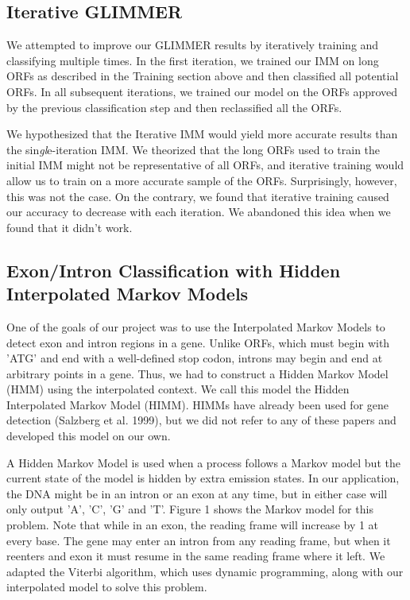 \documentclass[11pt,letterpaper]{article}
\begin{document}
\subsection{Iterative GLIMMER}
We attempted to improve our GLIMMER results by iteratively training and classifying multiple times. In the first iteration, we trained our IMM on long ORFs as described in the Training section above and then classified all potential ORFs. In all subsequent iterations, we trained our model on the ORFs approved by the previous classification step and then reclassified all the ORFs.

We hypothesized that the Iterative IMM would yield more accurate results than the sin\textit{gl}e-iteration IMM. We theorized that the long ORFs used to train the initial IMM might not be representative of all ORFs, and iterative training would allow us to train on a more accurate sample of the ORFs. Surprisingly, however, this was not the case. On the contrary, we found that iterative training caused our accuracy to decrease with each iteration. We abandoned this idea when we found that it didn't work.

\subsection{Exon/Intron Classification with Hidden Interpolated Markov Models}
One of the goals of our project was to use the Interpolated Markov Models to detect exon and intron regions in a gene. Unlike ORFs, which must begin with 'ATG' and end with a well-defined stop codon, introns may begin and end at arbitrary points in a gene. Thus, we had to construct a Hidden Markov Model (HMM) using the interpolated context. We call this model the Hidden Interpolated Markov Model (HIMM). HIMMs have already been used for gene detection (Salzberg et al. 1999), but we did not refer to any of these papers and developed this model on our own.

A Hidden Markov Model is used when a process follows a Markov model but the current state of the model is hidden by extra emission states. In our application, the DNA might be in an intron or an exon at any time, but in either case will only output 'A', 'C', 'G' and 'T'. Figure 1 shows the Markov model for this problem. Note that while in an exon, the reading frame will increase by 1 at every base. The gene may enter an intron from any reading frame, but when it reenters and exon it must resume in the same reading frame where it left. We adapted the Viterbi algorithm, which uses dynamic programming, along with our interpolated model to solve this problem.
\end{document}
